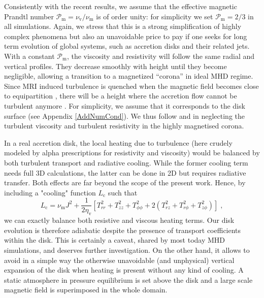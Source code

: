 \documentclass{aa}
\begin{document}
Consistently with the recent \citet{Lesur:2009bf} results, we assume that the effective magnetic Prandtl number $\mathcal{P}_\mathrm{m} = \nu_\mathrm{v}/\nu_\mathrm{m}$ is of
order unity: for simplicity we set $\mathcal{P}_\mathrm{m} = 2/3$ in all simulations. Again, we stress that this is a strong simplification of highly complex phenomena but also an
unavoidable price to pay if one seeks for long term evolution of global systems, such as accretion disks and their related jets. 
With a constant $\mathcal{P}_\mathrm{m}$, the viscosity and resistivity will follow the same radial and vertical profiles. They decrease smoothly with height until they become negligible, allowing a transition to
a magnetized ``corona'' in ideal MHD regime. Since MRI induced turbulence is quenched when the magnetic field becomes close to equipartition \citep{1991ApJ...376..214B}, there will be a height where
the accretion flow cannot be turbulent anymore \citep{2008ApJ...677.1221R}. For simplicity, we assume that it corresponds to the disk surface (see Appendix \ref{AddNumCond}). We thus follow
\citet{2002ApJ...581..988C,2004ApJ...601...90C} and \citet{2007A&A...469..811Z} in neglecting the turbulent viscosity and turbulent resistivity in the highly magnetised corona.

 In a real accretion disk, the local heating due to turbulence (here crudely modeled by alpha prescriptions for resistivity and viscosity) would be balanced by both turbulent transport and
radiative cooling. While the former cooling term needs full 3D calculations, the latter can be done in 2D but requires radiative transfer. Both effects are far beyond the scope of the present
work. Hence, by including a "cooling" function $L_\mathrm{c}$ such that
\begin{equation}
L_\mathrm{c} = \nu_\mathrm{m} J^2 + \frac{1}{2\eta_\mathrm{v}} \left[ T_{rr}^2+T_{zz}^2+T_{\phi\phi}^2+ 2 (T_{rz}^2+T_{r\phi}^2+T_{z\phi}^2 ) \right] \; ,
\end{equation}
we can exactly balance both resistive and viscous heating terms. Our disk evolution is therefore adiabatic despite the presence of transport coefficients within the disk. This is certainly a caveat,
shared by most today MHD simulations, and deserves further investigation. On the other hand, it allows to avoid in a simple way the otherwise unavoidable (and unphysical) vertical expansion of the
disk when heating is present without any kind of cooling.
A static atmosphere in pressure equilibrium is set above the disk and a large scale magnetic field is superimposed in the whole domain.
\end{document}
